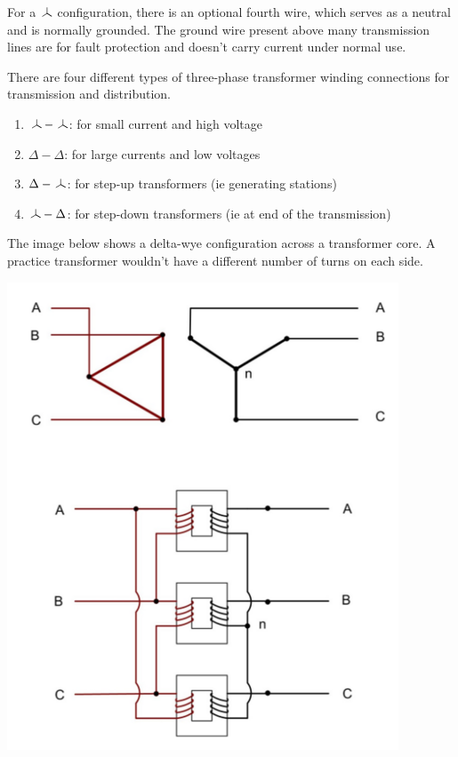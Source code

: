 For a $\wye$ configuration, there is an optional fourth wire, which serves as a neutral and is normally grounded. The ground wire present above many transmission lines are for fault protection and doesn't carry current under normal use.

There are four different types of three-phase transformer winding connections for transmission and distribution.
\begin{enumerate}
    \item $\wye - \wye$: for small current and high voltage
    \item $\Delta - \Delta$: for large currents and low voltages
    \item $\Delta - \wye$: for step-up transformers (ie generating stations)
    \item $\wye - \Delta$: for step-down transformers (ie at end of the transmission)
\end{enumerate}

The image below shows a delta-wye configuration across a transformer core. A practice transformer wouldn't have a different number of turns on each side.
\begin{center}
    \includegraphics[scale=0.5]{figs/Delta-Wye_Transformer.png}
\end{center}